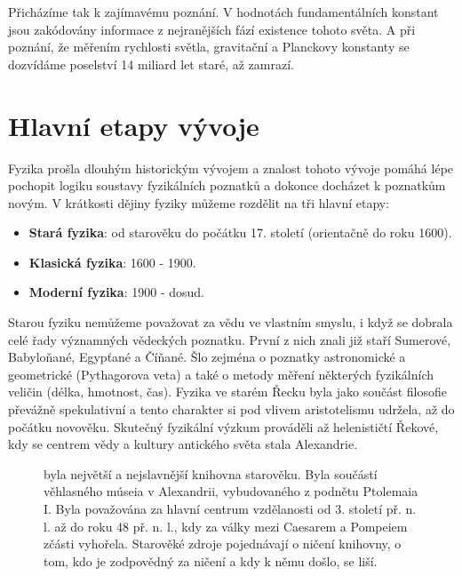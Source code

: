       Přicházíme tak k zajímavému poznání. V hodnotách fundamentálních konstant jsou zakódovány
      informace z nejranějších fází existence tohoto světa. A při poznání, že měřením rychlosti
      světla, gravitační a Planckovy konstanty se dozvídáme poselství 14 miliard let staré, až
      zamrazí.

      

  
    
  \section{Hlavní etapy vývoje}\label{fyz:IchapIsecIII}
    Fyzika prošla dlouhým historickým vývojem a znalost tohoto vývoje pomáhá lépe pochopit logiku 
    soustavy fyzikálních poznatků a dokonce do\-cházet k poznatkům novým. V krátkosti dějiny 
    fyziky můžeme rozdělit na tři hlavní etapy:
    \begin{itemize}[noitemsep]
     	\item \textbf{Stará fyzika}: od starověku do počátku 17. století (orientačně do roku 1600).
      \item \textbf{Klasická fyzika}: 1600 - 1900.
      \item \textbf{Moderní fyzika}: 1900 - dosud.
    \end{itemize}
    Starou fyziku nemůžeme považovat za vědu ve vlastním smyslu, i když se dobrala celé řady 
    významných vědeckých poznatku. První z nich znali již staří Sumerové, Babyloňané, Egypťané a 
    Číňané. Šlo zejména o  poznatky astronomické a geometrické (Pythagorova veta) a také o metody 
    měření některých fyzikálních veličin (délka, hmotnost, čas). Fyzika ve starém Řecku byla jako 
    součást filosofie převážně spekulativní a tento charakter si pod vlivem aristotelismu udržela, 
    až do počátku novověku. Skutečný fyzikální výzkum prováděli až helenističtí Řekové, kdy se 
    centrem vědy a kultury antického světa stala Alexandrie. 
    
    \begin{figure}[ht!]  %
      \centering
      \caption{ \wikiAlexLib byla největší a nejslavnější knihovna starověku. Byla součástí
                věhlasného múseia v Alexandrii, vybudovaného z podnětu Ptolemaia I. Byla považována
                za hlavní centrum vzdělanosti od 3. století př. n. l. až do roku 48 př. n. l., kdy
                za války mezi Caesarem a Pompeiem zčásti vyhořela. Starověké zdroje pojednávají o
                ničení knihovny, o tom, kdo je zodpovědný za ničení a kdy k němu došlo, se liší.}
      \label{fyz:fig894}
    \end{figure} 

